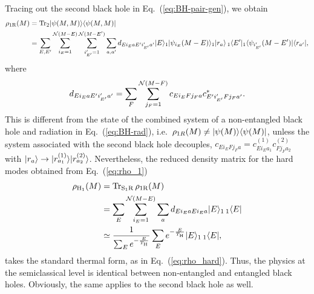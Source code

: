 \documentclass[12pt]{article}
\begin{document}
Tracing out the second black hole in Eq.~(\ref{eq:BH-pair-gen}), 
we obtain
%
\begin{align}
  \rho_{1 {\rm R}}(M) &= {\rm Tr}_2 \ket{\psi(M,M)} \bra{\psi(M,M)} 
\nonumber\\
  &= \sum_{E,E'} \sum_{i_E = 1}^{{\cal N}(M-E)} 
    \sum_{i'_{E'} = 1}^{{\cal N}(M-E')} \sum_{a,a'} 
    d_{E i_E a E' i'_{E'} a'} \ket{E}_1 \ket{\psi_{i_E}(M-E)}_1 
    \ket{r_a}\, {}_1\bra{E'} {}_1\bra{\psi_{i'_{E'}}(M-E')} 
    \bra{r_{a'}},
\label{eq:rho_1}
\end{align}
%
where
%
\begin{equation}
  d_{E i_E a E' i'_{E'} a'} = \sum_F \sum_{j_F = 1}^{{\cal N}(M-F)} 
    c_{E i_E F j_F a} c_{E' i'_{E'} F j_F a'}^*.
\label{eq:c_EE'}
\end{equation}
%
This is different from the state of the combined system of a 
non-entangled black hole and radiation in Eq.~(\ref{eq:BH-rad}), 
i.e.\ $\rho_{1R}(M) \neq | \psi(M) \rangle \langle \psi(M) |$, unless 
the system associated with the second black hole decouples, 
$c_{E i_E F j_F a} = c^{(1)}_{E i_E a_1} c^{(2)}_{F j_F a_2}$ with 
$| r_a \rangle \rightarrow | r^{(1)}_{a_1} \rangle | r^{(2)}_{a_2} \rangle$. 
Nevertheless, the reduced density matrix for the hard modes obtained 
from Eq.~(\ref{eq:rho_1})
%
\begin{align}
  \rho_{{\rm H}_1}(M) &= {\rm Tr}_{{\rm S}_1 {\rm R}}\, 
    \rho_{1 {\rm R}}(M) 
\nonumber\\
  &= \sum_E \sum_{i_E = 1}^{{\cal N}(M-E)} \sum_a 
    d_{E i_E a E i_E a} \ket{E}_1\, {}_1\bra{E} 
\nonumber\\
  &\simeq \frac{1}{\sum_E e^{-\frac{E}{T_{\rm H}}}} 
    \sum_E e^{-\frac{E}{T_{\rm H}}} \ket{E}_1\, {}_1\bra{E},
\label{eq:rho_H1}
\end{align}
%
takes the standard thermal form, as in Eq.~(\ref{eq:rho_hard}). 
Thus, the physics at the semiclassical level is identical between 
non-entangled and entangled black holes.  Obviously, the same 
applies to the second black hole as well.
\end{document}
